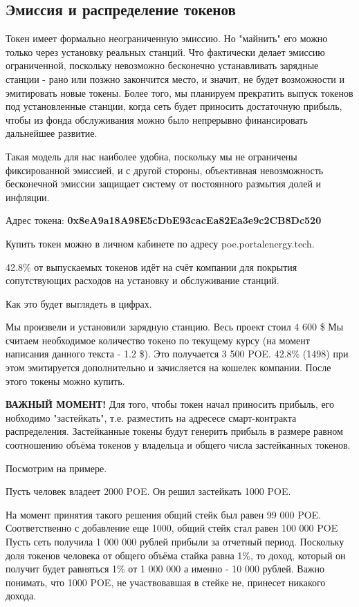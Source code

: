 \documentclass[a4paper,12pt]{report}
\begin{document}
\subsection{Эмиссия и распределение токенов}

Токен имеет формально неограниченную эмиссию. Но "майнить" его можно только через установку реальных станций. Что фактически делает эмиссию ограниченной, поскольку невозможно бесконечно устанавливать зарядные станции - рано или позжно закончится место, и значит, не будет возможности и эмитировать новые токены. Более того, мы планируем прекратить выпуск токенов под установленные станции, когда сеть будет приносить достаточную прибыль, чтобы из фонда обслуживания можно было непрерывно финансировать дальнейшее развитие. 

Такая модель для нас наиболее удобна, поскольку мы не ограничены фиксированной эмиссией, и с другой стороны, объективная невозможность бесконечной эмиссии защищает систему от постоянного размытия долей и инфляции. 

 
Адрес токена:
\textbf{0x8eA9a18A98E5cDbE93cacEa82Ea3e9c2CB8Dc520}

Купить токен можно в личном кабинете по адресу poe.portalenergy.tech.  

42.8\% от выпускаемых токенов идёт на счёт компании для покрытия сопутствующих расходов на установку и обслуживание станций.

Как это будет выглядеть в цифрах.

Мы произвели и установили зарядную станцию. Весь проект стоил 4 600 \$ Мы считаем необходимое количество токено по текущему курсу (на момент написания данного текста - 1.2 \$). Это получается 3 500 POE. 42.8\% (1498) при этом эмитируется дополнительно и зачисляется на кошелек компании. После этого токены можно купить.

\textbf{ВАЖНЫЙ МОМЕНТ!} Для того, чтобы токен начал приносить прибыль, его нобходимо "застейкать", т.е. разместить на адресесе смарт-контракта распределения. Застейканные токены будут генерить прибыль в размере равном соотношению объёма токенов у владельца и общего числа застейканных токенов. 

Посмотрим на примере.

Пусть человек владеет 2000 POE. Он решил застейкать 1000 POE.

На момент принятия такого решения общий стейк был равен 99 000 POE. Соответственно с добавление еще 1000, общий стейк стал равен 100 000 POE
Пусть сеть получила 1 000 000 рублей прибыли за отчетный период. Поскольку доля токенов человека от общего объёма стайка равна 1\%, то доход, который он получит будет равняться 1\% от 1 000 000 а именно - 10 000 рублей. Важно понимать, что 1000 POE, не участвовавшая в стейке не, принесет никакого дохода. 
\end{document}
